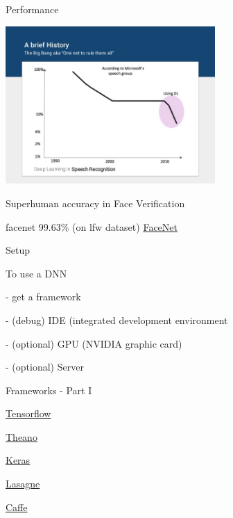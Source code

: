 \documentclass[12pt,t]{beamer}
\begin{document}
\begin{frame}[c]{Performance}

\includegraphics[height=60mm]{Figs/performance_speech_year.jpg}
\pause

Superhuman accuracy in Face Verification
\pause

facenet 99.63\% (on lfw dataset)  
\href{http://www.cv-foundation.org/openaccess/content_cvpr_2015/app/1A_089_ext.pdf}{FaceNet}
\pause
\end{frame}

\begin{frame}[c]{Setup}

\pause

To use a DNN
\pause

- get a framework
\pause

- (debug) IDE (integrated development environment
\pause

- (optional) GPU (NVIDIA graphic card)
\pause

- (optional) Server
 
\end{frame}

\begin{frame}[c]{ Frameworks - Part I}

\pause

\href{https://www.tensorflow.org/}{Tensorflow}
\pause

\href{http://deeplearning.net/software/theano/}{Theano}
\pause

\href{https://keras.io/}{Keras}
\pause

\href{http://lasagne.readthedocs.io/en/latest/index.html}{Lasagne}
\pause

\href{http://caffe.berkeleyvision.org/}{Caffe}

\end{frame}
\end{document}
